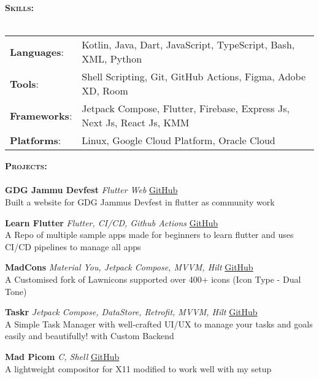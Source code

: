 \documentclass[a4paper]{article}
\newcommand{\lineunder} {
    \vspace*{-8pt} \\
    \hspace*{-18pt} \hrulefill \\
}
\newcommand{\header} [1] {
    {\hspace*{-18pt}\vspace*{6pt} \textsc{#1} }
    \vspace*{-6pt} \lineunder
}
\begin{document}
\header{\textbf{Skills:}}
\begin{tabular}{ l l }
	{\textbf{Languages}}:  
        & Kotlin, Java, Dart, JavaScript, TypeScript, Bash, XML, Python          \\
	{\textbf{Tools}}:   
        & Shell Scripting, Git, GitHub Actions, Figma, Adobe XD, Room            \\
	{\textbf{Frameworks}}:
        & Jetpack Compose, Flutter, Firebase, Express Js, Next Js, React Js, KMM \\
	{\textbf{Platforms}}: 
        & Linux, Google Cloud Platform, Oracle Cloud                             \\
\end{tabular}
\vspace{2mm}

\header{ \textbf{Projects:}}
{\textbf{GDG Jammu Devfest}} {\sl Flutter Web}
    \hfill \href{https://github.com/GDG-Jammu}{GitHub}\\
    Built a website for GDG Jammu\textquotesingle{}s Devfest in flutter as community work\\
\vspace*{2mm}

{\textbf{Learn Flutter}} {\sl Flutter, CI/CD, Github Actions} 
    \hfill \href{https://github.com/MadFlasheroo7/Learn-Flutter}{GitHub}\\
    A Repo of multiple sample apps made for beginners to learn flutter and uses CI/CD pipelines to manage all apps\\
\vspace*{2mm}

{\textbf{MadCons}} {\sl Material You, Jetpack Compose, MVVM, Hilt} 
    \hfill \href{https://github.com/MadFlasheroo7/madcons}{GitHub}\\
    A Customised fork of Lawnicons supported over 400+ icons (Icon Type - Dual Tone)\\
\vspace*{2mm}

{\textbf{Taskr}} {\sl Jetpack Compose, DataStore, Retrofit, MVVM, Hilt} 
    \hfill \href{https://github.com/taskr-org}{GitHub}\\
    A Simple Task Manager with well-crafted UI/UX to manage your tasks and goals easily and beautifully! with Custom Backend\\
\vspace*{2mm}

{\textbf{Mad Picom}} {\sl C, Shell} 
    \hfill \href{https://github.com/MadFlasheroo7/mad-picom}{GitHub}\\
    A lightweight compositor for X11 modified to work well with my setup\\
\vspace*{2mm}
\end{document}
